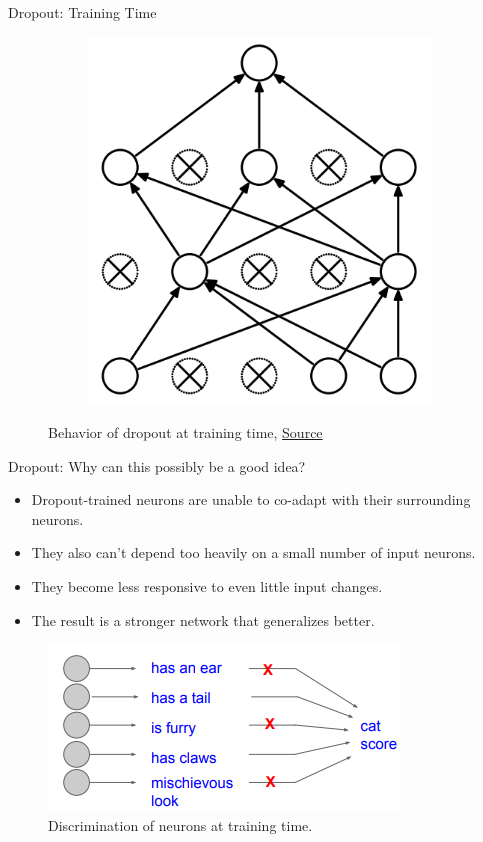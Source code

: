 \documentclass[compress,oilve,t]{beamer}
\newcommand{\tc}[2]{
	\textcolor{#1}{\hspace{-2pt}#2\hspace{-2pt}}
}
\begin{document}
\begin{frame}{Dropout: Training Time}
\begin{figure}[H]
\begin{subfigure}[b]{0.45\textwidth}
			\includegraphics[height=0.4\textheight]{Figs/Dropout-after.png}
		\end{subfigure}
		\caption{Behavior of dropout at training time, \href{https://www.cs.toronto.edu/~hinton/absps/JMLRdropout.pdf}{Source}}
	\end{figure}
\end{frame}
\begin{frame}{Dropout: Why can this possibly be a good idea?}
	\begin{itemize}
		\item Dropout-trained neurons are unable to \tc{keywords}{co-adapt} with their surrounding neurons.
		\item They also can't depend too heavily on a small number of input neurons.
		\item They become less responsive to even little input changes.
		\item The result is a stronger network that \tc{keywords}{generalizes} better.
	\end{itemize}
	\begin{figure}[H]
		\centering
		\includegraphics[height=0.4\textheight]{Figs/section_4/dropout_why.png}
		\caption{Discrimination of neurons at training time. \cite{cs231n-2018-lecture7}}
	\end{figure}
\end{frame}
\end{document}

